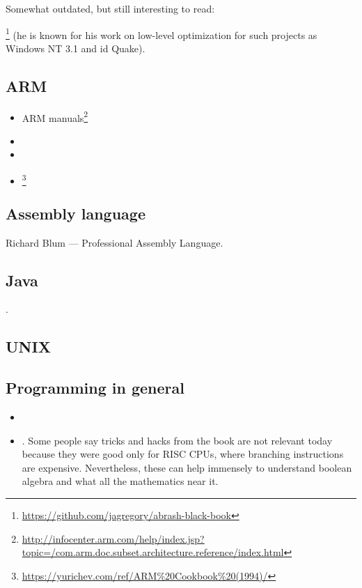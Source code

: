 Somewhat outdated, but still interesting to read:

\MAbrash\footnote{\AlsoAvailableAs \url{https://github.com/jagregory/abrash-black-book}}
(he is known for his work on low-level optimization for such projects as Windows NT 3.1 and id Quake).

\subsection{ARM}

\begin{itemize}
\item ARM manuals\footnote{\AlsoAvailableAs \url{http://infocenter.arm.com/help/index.jsp?topic=/com.arm.doc.subset.architecture.reference/index.html}}

\item \ARMSevenRef

\item \ARMSixFourRefURL

\item \ARMCookBook\footnote{\AlsoAvailableAs \url{https://yurichev.com/ref/ARM%20Cookbook%20(1994)/}}
\end{itemize}

\subsection{Assembly language}

Richard Blum --- Professional Assembly Language.

\subsection{Java}

\JavaBook.

\subsection{UNIX}

\TAOUP

\subsection{Programming in general}

\begin{itemize}

\item \RobPikePractice

\item \HenryWarren.
Some people say tricks and hacks from the book are not relevant today because they were good only for \ac{RISC} \ac{CPU}s,
where branching instructions are expensive.
Nevertheless, these can help immensely to understand boolean algebra and what all the mathematics near it.

\end{itemize}

